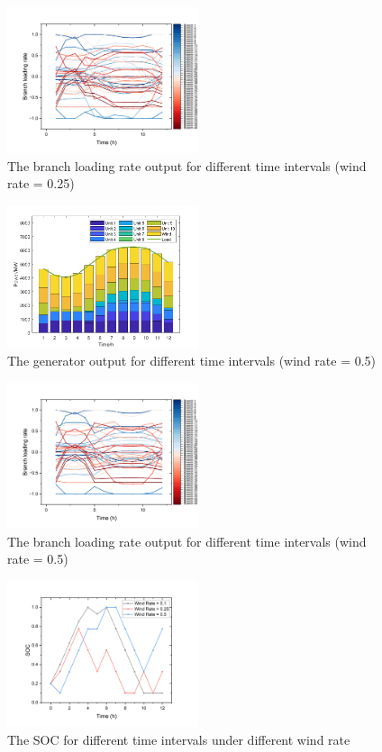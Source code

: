 \documentclass[lettersize,journal]{IEEEtran}
\begin{document}
\begin{figure}[htbp]
	\centering
	\includegraphics[width=0.5\textwidth]{t3-br-wr0.25}
	\caption{The branch loading rate output for different time intervals (wind rate = 0.25)}
	\label{fig_2}
\end{figure}

\begin{figure}[htbp]
	\centering
	\includegraphics[width=0.5\textwidth]{t3-wr0.5}
	\caption{The generator output for different time intervals (wind rate = 0.5)}
	\label{fig_2}
\end{figure}

\begin{figure}[htbp]
	\centering
	\includegraphics[width=0.5\textwidth]{t3-br-wr0.5}
	\caption{The branch loading rate output for different time intervals (wind rate = 0.5)}
	\label{fig_2}
\end{figure}

\begin{figure}[htbp]
	\centering
	\includegraphics[width=0.5\textwidth]{t3-SOC}
	\caption{The SOC for different time intervals under different wind rate}
	\label{fig_2}
\end{figure}
\end{document}

